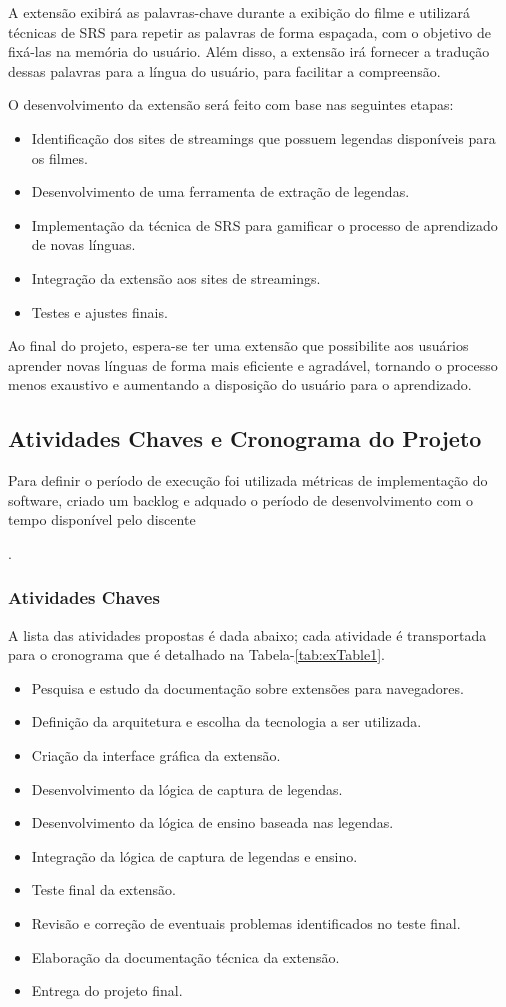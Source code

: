 \documentclass[12pt]{article}
\begin{document}
A extensão exibirá as palavras-chave durante a exibição do filme e utilizará técnicas de SRS para repetir as palavras de forma espaçada, com o objetivo de fixá-las na memória do usuário. Além disso, a extensão irá fornecer a tradução dessas palavras para a língua do usuário, para facilitar a compreensão.


O desenvolvimento da extensão será feito com base nas seguintes etapas:
\begin{itemize}
\item Identificação dos sites de streamings que possuem legendas disponíveis para os filmes.
\item Desenvolvimento de uma ferramenta de extração de legendas.
\item Implementação da técnica de SRS para gamificar o processo de aprendizado de novas línguas.
\item Integração da extensão aos sites de streamings.
\item Testes e ajustes finais.
\end{itemize}
Ao final do projeto, espera-se ter uma extensão que possibilite aos usuários aprender novas línguas de forma mais eficiente e agradável, tornando o processo menos exaustivo e aumentando a disposição do usuário para o aprendizado.

\subsection{Atividades Chaves e Cronograma do Projeto}

Para definir o período de execução foi utilizada métricas de implementação do software, criado um backlog e adquado o período de desenvolvimento com o tempo disponível pelo discente  \author{J. Emanuel Cascone R. S.}.

\subsubsection{Atividades Chaves}

A lista das atividades propostas é dada abaixo; cada atividade é transportada para o cronograma que é detalhado na Tabela-\ref{tab:exTable1}.

\begin{itemize}
\item Pesquisa e estudo da documentação sobre extensões para navegadores.
\item Definição da arquitetura e escolha da tecnologia a ser utilizada.
\item Criação da interface gráfica da extensão.
\item Desenvolvimento da lógica de captura de legendas.
\item Desenvolvimento da lógica de ensino baseada nas legendas.
\item Integração da lógica de captura de legendas e ensino.
\item Teste final da extensão.
\item Revisão e correção de eventuais problemas identificados no teste final.
\item Elaboração da documentação técnica da extensão.
\item Entrega do projeto final.
\end{itemize}
\end{document}
